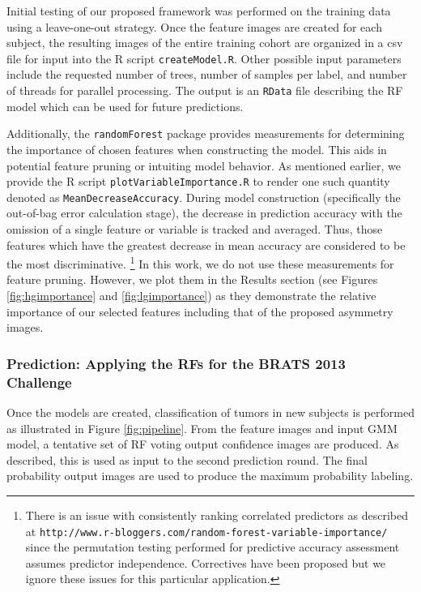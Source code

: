 \documentclass[preprint,authoryear,review,12pt]{elsarticle}
\begin{document}
{Initial testing of our proposed framework was performed 
on the training data using a leave-one-out strategy.  Once the
feature images are created for each subject, the resulting images of the entire
training cohort are organized in a csv file for input into the R script
{\tt createModel.R}.  Other possible input parameters include the requested 
number of trees, number of samples per label, and number of threads for parallel
processing.  The output is an {\tt RData} file describing the RF
model which can be used for future predictions.
 
Additionally, the {\tt randomForest} package provides  measurements 
for determining the importance of chosen features when constructing the model.  
This aids in potential feature pruning or intuiting model behavior.  As mentioned
earlier, we provide the R script {\tt plotVariableImportance.R} to render
one such quantity denoted as {\tt MeanDecreaseAccuracy}.  During model construction
(specifically the out-of-bag error calculation stage), the decrease in prediction accuracy
with the omission of a single feature or variable is tracked and averaged.  Thus,
those features which have the greatest decrease in mean accuracy are considered
to be the most discriminative.%
\footnote{
There is an issue with consistently ranking correlated predictors as described at {\tt http://www.r-bloggers.com/random-forest-variable-importance/} since the permutation testing performed for predictive accuracy assessment assumes predictor independence.  Correctives have been proposed but we ignore these issues for this particular application.
}
In this work, we do not use these measurements for feature pruning.  However,
we plot them in the Results section (see Figures \ref{fig:hgimportance} and
\ref{fig:lgimportance}) as they demonstrate the relative importance of our
selected features including that of the proposed asymmetry images.

\subsubsection{Prediction:  Applying the RFs for the BRATS 2013 Challenge}

Once the models are created, classification of tumors in new subjects is performed
as illustrated in Figure \ref{fig:pipeline}.  From the feature images and input 
GMM model, a tentative set of RF voting output confidence images are produced.
As described, this is used as input to the second prediction round.  The 
final probability output images are used to produce the maximum probability labeling.  

}
\end{document}
